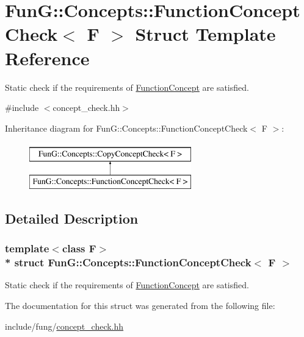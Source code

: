 \hypertarget{structFunG_1_1Concepts_1_1FunctionConceptCheck}{}\section{FunG\+:\+:Concepts\+:\+:Function\+Concept\+Check$<$ F $>$ Struct Template Reference}
\label{structFunG_1_1Concepts_1_1FunctionConceptCheck}


Static check if the requirements of \hyperlink{structFunG_1_1Concepts_1_1FunctionConcept}{Function\+Concept} are satisfied.  




{\ttfamily \#include $<$concept\+\_\+check.\+hh$>$}

Inheritance diagram for FunG\+:\+:Concepts\+:\+:Function\+Concept\+Check$<$ F $>$\+:\begin{figure}[H]
\begin{center}
\leavevmode
\includegraphics[height=2.000000cm]{structFunG_1_1Concepts_1_1FunctionConceptCheck}
\end{center}
\end{figure}


\subsection{Detailed Description}
\subsubsection*{template$<$class F$>$\\*
struct Fun\+G\+::\+Concepts\+::\+Function\+Concept\+Check$<$ F $>$}

Static check if the requirements of \hyperlink{structFunG_1_1Concepts_1_1FunctionConcept}{Function\+Concept} are satisfied. 

The documentation for this struct was generated from the following file\+:\begin{DoxyCompactItemize}
\item 
include/fung/\hyperlink{concept__check_8hh}{concept\+\_\+check.\+hh}\end{DoxyCompactItemize}
